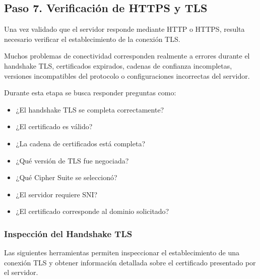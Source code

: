 \documentclass[a4paper,10pt]{article}
\begin{document}

\subsection{Paso 7. Verificación de HTTPS y TLS}

Una vez validado que el servidor responde mediante HTTP o HTTPS, resulta
necesario verificar el establecimiento de la conexión TLS.

Muchos problemas de conectividad corresponden realmente a errores durante el
handshake TLS, certificados expirados, cadenas de confianza incompletas,
versiones incompatibles del protocolo o configuraciones incorrectas del
servidor.

Durante esta etapa se busca responder preguntas como:

\begin{itemize}
\item ¿El handshake TLS se completa correctamente?
\item ¿El certificado es válido?
\item ¿La cadena de certificados está completa?
\item ¿Qué versión de TLS fue negociada?
\item ¿Qué Cipher Suite se seleccionó?
\item ¿El servidor requiere SNI?
\item ¿El certificado corresponde al dominio solicitado?
\end{itemize}


\subsubsection{Inspección del Handshake TLS}

Las siguientes herramientas permiten inspeccionar el establecimiento de una
conexión TLS y obtener información detallada sobre el certificado presentado
por el servidor.
\end{document}
